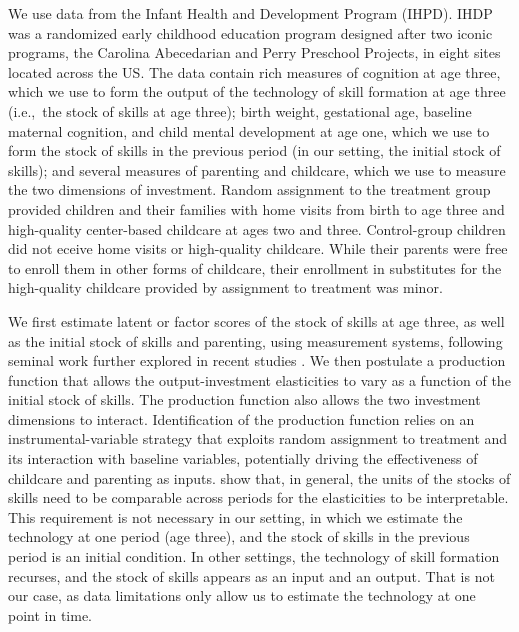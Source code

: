 We use data from the Infant Health and Development Program (IHPD). IHDP was a randomized early childhood education program designed after two iconic programs, the Carolina Abecedarian and Perry Preschool Projects, in eight sites located across the US. The data contain rich measures of cognition at age three, which we use to form the output of the technology of skill formation at age three (i.e.,\ the stock of skills at age three); birth weight, gestational age, baseline maternal cognition, and child mental development at age one, which we use to form the stock of skills in the previous period (in our setting, the initial stock of skills); and several measures of parenting and childcare, which we use to measure the two dimensions of investment. Random assignment to the treatment group provided children and their families with home visits from birth to age three and high-quality center-based childcare at ages two and three. Control-group children did not  eceive home visits or high-quality childcare. While their parents were free to enroll them in other forms of childcare, their enrollment in substitutes for the high-quality childcare provided by assignment to treatment was minor. 

We first estimate latent or factor scores of the stock of skills at age three, as well as the initial stock of skills and parenting, using measurement systems, following seminal work \citep{cunhaEstimatingTechnologyCognitive2010a,cunhaFormulatingIdentifyingEstimating2008a} further explored in recent studies \citep{agostinelliEstimatingTechnologyChildren2016a,agostinelliIdentificationDynamicLatent2016}. We then postulate a production function that allows the output-investment elasticities to vary as a function of the initial stock of skills. The production function also allows the two investment dimensions to interact. Identification of the production function relies on an instrumental-variable strategy that exploits random assignment to treatment and its interaction with baseline variables, potentially driving the effectiveness of childcare and parenting as inputs. \citet{agostinelliIdentificationDynamicLatent2016} show that, in general, the units of the stocks of skills need to be comparable across periods for the elasticities to be interpretable. This requirement is not necessary in our setting, in which we estimate the technology at one period (age three), and the stock of skills in the previous period is an initial condition. In other settings, the technology of skill formation recurses, and the stock of skills appears as an input and an output. That is not our case, as data limitations only allow us to estimate the technology at one point in time. 

